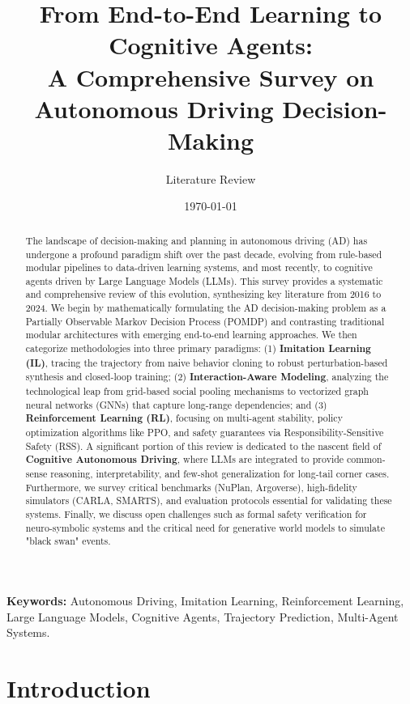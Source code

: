 \documentclass[12pt, a4paper]{article}
\title{\textbf{From End-to-End Learning to Cognitive Agents: \\ A Comprehensive Survey on Autonomous Driving Decision-Making}}
\author{\large Literature Review}
\date{\today}
\begin{document}
\maketitle

\begin{abstract}
The landscape of decision-making and planning in autonomous driving (AD) has undergone a profound paradigm shift over the past decade, evolving from rule-based modular pipelines to data-driven learning systems, and most recently, to cognitive agents driven by Large Language Models (LLMs). This survey provides a systematic and comprehensive review of this evolution, synthesizing key literature from 2016 to 2024. We begin by mathematically formulating the AD decision-making problem as a Partially Observable Markov Decision Process (POMDP) and contrasting traditional modular architectures with emerging end-to-end learning approaches. We then categorize methodologies into three primary paradigms: (1) \textbf{Imitation Learning (IL)}, tracing the trajectory from naive behavior cloning to robust perturbation-based synthesis and closed-loop training; (2) \textbf{Interaction-Aware Modeling}, analyzing the technological leap from grid-based social pooling mechanisms to vectorized graph neural networks (GNNs) that capture long-range dependencies; and (3) \textbf{Reinforcement Learning (RL)}, focusing on multi-agent stability, policy optimization algorithms like PPO, and safety guarantees via Responsibility-Sensitive Safety (RSS). A significant portion of this review is dedicated to the nascent field of \textbf{Cognitive Autonomous Driving}, where LLMs are integrated to provide common-sense reasoning, interpretability, and few-shot generalization for long-tail corner cases. Furthermore, we survey critical benchmarks (NuPlan, Argoverse), high-fidelity simulators (CARLA, SMARTS), and evaluation protocols essential for validating these systems. Finally, we discuss open challenges such as formal safety verification for neuro-symbolic systems and the critical need for generative world models to simulate "black swan" events.
\end{abstract}

\textbf{Keywords:} Autonomous Driving, Imitation Learning, Reinforcement Learning, Large Language Models, Cognitive Agents, Trajectory Prediction, Multi-Agent Systems.

\newpage
\tableofcontents
\newpage

\section{Introduction}
\label{sec:intro}
\end{document}
